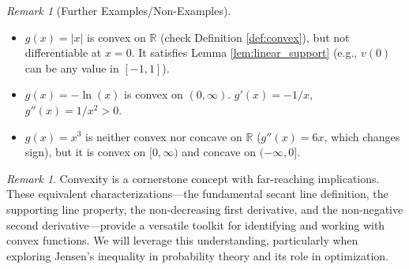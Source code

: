 \documentclass[11pt]{article}
\theoremstyle{definition}
\theoremstyle{remark}
\newtheorem{remark}[theorem]{Remark}
\begin{document}
\begin{remark}[Further Examples/Non-Examples]
\begin{itemize}
    \item $g(x) = |x|$ is convex on $\mathbb{R}$ (check Definition \ref{def:convex}), but not differentiable at $x=0$. It satisfies Lemma \ref{lem:linear_support} (e.g., $v(0)$ can be any value in $[-1, 1]$).
    \item $g(x) = -\ln(x)$ is convex on $(0, \infty)$. $g'(x) = -1/x$, $g''(x) = 1/x^2 > 0$.
    \item $g(x) = x^3$ is neither convex nor concave on $\mathbb{R}$ ($g''(x)=6x$, which changes sign), but it is convex on $[0, \infty)$ and concave on $(-\infty, 0]$.
\end{itemize}
\end{remark}

\begin{remark}
Convexity is a cornerstone concept with far-reaching implications. These equivalent characterizations—the fundamental secant line definition, the supporting line property, the non-decreasing first derivative, and the non-negative second derivative—provide a versatile toolkit for identifying and working with convex functions. We will leverage this understanding, particularly when exploring Jensen's inequality in probability theory and its role in optimization.
\end{remark}
\end{document}
